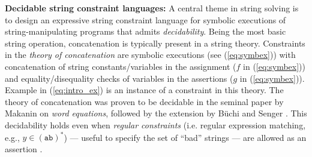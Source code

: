 \smallskip
\noindent
\textbf{Decidable string constraint languages:}
A central theme in string solving is to design an
expressive string constraint language for symbolic executions of 
string-manipulating
programs that admits \emph{decidability}. 
Being the most basic string operation,
concatenation is typically present in a string theory.
Constraints in the \emph{theory of concatenation} 
are symbolic executions (see (\ref{eq:symbex}))
with concatenation of string constants/variables in the
assignment ($f$ in (\ref{eq:symbex})) and equality/disequality checks of
variables in the assertions ($g$ in (\ref{eq:symbex})).
Example in (\ref{eq:intro_ex}) is an instance of a constraint in this theory.
The theory of concatenation was 
proven to be decidable in the seminal
paper by Makanin \cite{Makanin} on \emph{word equations}, followed by the
extension by B\"{u}chi and Senger \cite{buchi}.
This decidability holds even when
\emph{regular constraints} (i.e. regular expression matching, e.g., 
$y \in (\texttt{ab})^*$) --- useful to specify the set of ``bad'' strings ---
are allowed as an assertion \cite{Schulz}. 


